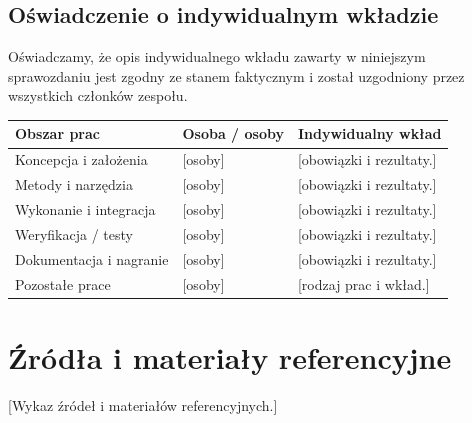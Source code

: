 \documentclass[11pt,a4paper,oneside]{article}
\newif\ifpodpowiedzi
\newcommand{\podpowiedz}[1]{\ifpodpowiedzi\par\begingroup\small\color{hintcolor}\textit{Wskazówka: #1}\par\endgroup\fi}
\newcommand{\pole}[1]{\textnormal{[#1]}}
\begin{document}
\subsection{Oświadczenie o indywidualnym wkładzie}
Oświadczamy, że opis indywidualnego wkładu zawarty w niniejszym sprawozdaniu jest zgodny ze stanem faktycznym i został uzgodniony przez wszystkich członków zespołu.
\podpowiedz{Wskaż konkretne obowiązki poszczególnych osób, a nie wyłącznie procenty. Obszary dostosuj do projektu; przy zadaniach wspólnych określ wkład każdej osoby. Tabela uzupełnia opis prac i nie powinna mu przeczyć.}
\begin{tabularx}{\textwidth}{@{}p{} Y Y@{}}
\toprule
Obszar prac & Osoba / osoby & Indywidualny wkład\\
\midrule
Koncepcja i założenia & \pole{osoby} & \pole{obowiązki i rezultaty.}\\
Metody i narzędzia & \pole{osoby} & \pole{obowiązki i rezultaty.}\\
Wykonanie i integracja & \pole{osoby} & \pole{obowiązki i rezultaty.}\\
Weryfikacja / testy & \pole{osoby} & \pole{obowiązki i rezultaty.}\\
Dokumentacja i nagranie & \pole{osoby} & \pole{obowiązki i rezultaty.}\\
Pozostałe prace & \pole{osoby} & \pole{rodzaj prac i wkład.}\\
\bottomrule
\end{tabularx}
\podpisy

\section*{Źródła i materiały referencyjne}
\podpowiedz{Wymień źródła przywołane w sprawozdaniu: publikacje, dokumentację, zbiory danych i inne zasoby. Dla materiałów internetowych podaj tytuł, adres i datę dostępu. Pełny wykaz techniczny może znajdować się w dokumentacji projektowej - wskaż wtedy odpowiednią sekcję. Jeśli nie wykorzystano źródeł zewnętrznych, wpisz tę informację.}
\pole{Wykaz źródeł i materiałów referencyjnych.}
\end{document}
